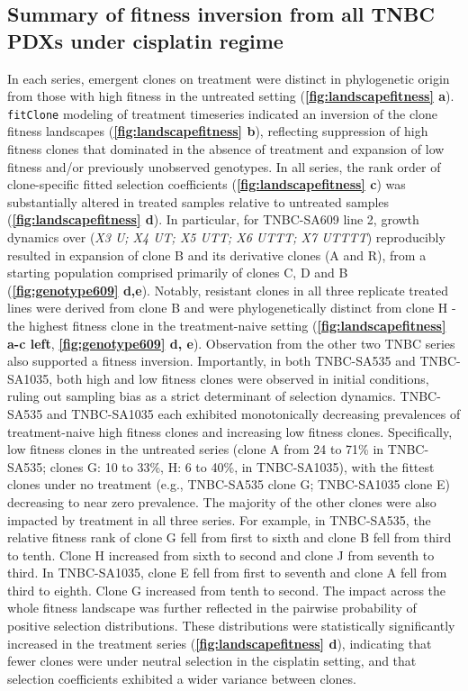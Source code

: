 \subsection{Summary of fitness inversion from all TNBC PDXs under cisplatin regime}
In each series, emergent clones on treatment were distinct in phylogenetic origin from those with high fitness in the untreated setting (\textbf{\autoref{fig:landscapefitness} a}). \texttt{fitClone} modeling of treatment timeseries indicated an inversion of the clone fitness landscapes (\textbf{\autoref{fig:landscapefitness} b}), reflecting suppression of high fitness clones that dominated in the absence of treatment and expansion of low fitness and/or previously unobserved genotypes. In all series, the rank order of clone-specific fitted selection coefficients (\textbf{\autoref{fig:landscapefitness} c}) was substantially altered in treated samples relative to untreated samples (\textbf{\autoref{fig:landscapefitness} d}). In particular, for TNBC-SA609 line 2, growth dynamics over (\textit{X3 U; X4 UT; X5 UTT; X6 UTTT; X7 UTTTT}) reproducibly resulted in expansion of clone B and its derivative clones (A and R), from a starting population comprised primarily of clones C, D and B (\textbf{\autoref{fig:genotype609} d,e}). Notably, resistant clones in all three replicate treated lines were derived from clone B and were phylogenetically distinct from clone H - the highest fitness clone in the treatment-naive setting  (\textbf{\autoref{fig:landscapefitness} a-c left}, \textbf{\autoref{fig:genotype609} d, e}). Observation from the other two TNBC series also supported a fitness inversion. Importantly, in both TNBC-SA535 and TNBC-SA1035, both high and low fitness clones were observed in initial conditions, ruling out sampling bias as a strict determinant of selection dynamics. TNBC-SA535 and TNBC-SA1035 each exhibited monotonically decreasing prevalences of treatment-naive high fitness clones and increasing low fitness clones. Specifically, low fitness clones in the untreated series (clone A from 24 to 71\% in TNBC-SA535; clones G: 10 to 33\%, H: 6 to 40\%, in TNBC-SA1035), with the fittest clones under no treatment (e.g., TNBC-SA535 clone G; TNBC-SA1035 clone E) decreasing to near zero prevalence. The majority of the other clones were also impacted by treatment in all three series. For example, in TNBC-SA535, the relative fitness rank of clone G fell from first to sixth and clone B fell from third to tenth. Clone H increased from sixth to second and clone J from seventh to third. In TNBC-SA1035, clone E fell from first to seventh and clone A fell from third to eighth. Clone G increased from tenth to second. The impact across the whole fitness landscape was further reflected in the pairwise probability of positive selection distributions. These distributions were statistically significantly increased in the treatment series  (\textbf{\autoref{fig:landscapefitness} d}), indicating that fewer clones were under neutral selection in the cisplatin setting, and that selection coefficients exhibited a wider variance between clones. 
